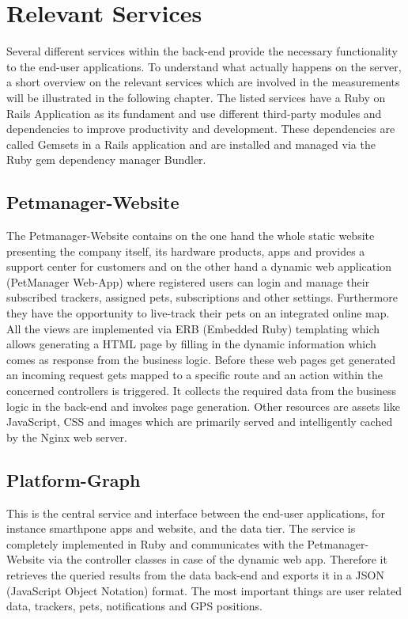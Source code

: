 \section{Relevant Services}
Several different services within the back-end provide the necessary functionality to the end-user applications. To understand what actually happens on the server, a short overview on the relevant services which are involved in the measurements will be illustrated in the following chapter. The listed services have a Ruby on Rails Application as its fundament and use different third-party modules and dependencies to improve productivity and development. These dependencies are called Gemsets in a Rails application and are installed and managed via the Ruby gem dependency manager Bundler. 

\subsection{Petmanager-Website}
The Petmanager-Website contains on the one hand the whole static website presenting the company itself, its hardware products, apps and provides a support center for customers and on the other hand a dynamic web application (PetManager Web-App) where registered users can login and manage their subscribed trackers, assigned pets, subscriptions and other settings. Furthermore they have the opportunity to live-track their pets on an integrated online map. All the views are implemented via ERB (Embedded Ruby) templating which allows generating a HTML page by filling in the dynamic information which comes as response from the business logic. Before these web pages get generated an incoming request gets mapped to a specific route and an action within the concerned controllers is triggered. It collects the required data from the business logic in the back-end and invokes page generation. Other resources are assets like JavaScript, CSS and images which are primarily served and intelligently cached by the Nginx web server. 

\subsection{Platform-Graph}
This is the central service and interface between the end-user applications, for instance smarthpone apps and website, and the data tier. The service is completely implemented in Ruby and communicates with the Petmanager-Website via the controller classes in case of the dynamic web app. Therefore it retrieves the queried results from the data back-end and exports it in a JSON (JavaScript Object Notation) format. The most important things are user related data, trackers, pets, notifications and GPS positions. 


